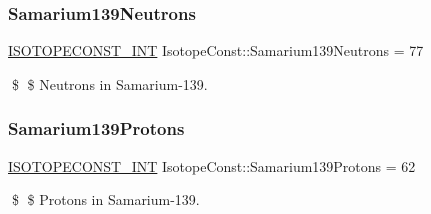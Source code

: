 \subsubsection{\texorpdfstring{Samarium139\+Neutrons}{Samarium139Neutrons}}
{\footnotesize\ttfamily \mbox{\hyperlink{group___isotope_const-_macros_ga5f18360b3e99483a35c32d789e62621c}{I\+S\+O\+T\+O\+P\+E\+C\+O\+N\+S\+T\+\_\+\+I\+NT}} Isotope\+Const\+::\+Samarium139\+Neutrons = 77}

\$ \$ Neutrons in Samarium-\/139. \mbox{\label{group___isotope_const-_samarium-_sm139_ga4828f868aee3c187ca17f6f7ba55a00a}} 
\subsubsection{\texorpdfstring{Samarium139\+Protons}{Samarium139Protons}}
{\footnotesize\ttfamily \mbox{\hyperlink{group___isotope_const-_macros_ga5f18360b3e99483a35c32d789e62621c}{I\+S\+O\+T\+O\+P\+E\+C\+O\+N\+S\+T\+\_\+\+I\+NT}} Isotope\+Const\+::\+Samarium139\+Protons = 62}

\$ \$ Protons in Samarium-\/139. 
